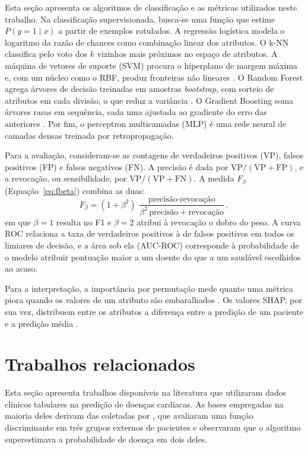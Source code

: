 \documentclass[12pt]{article}
\begin{document}
Esta seção apresenta os algoritmos de classificação e as métricas utilizados
neste trabalho. Na classificação supervisionada, busca-se uma função que
estime $P(y=1 \mid x)$ a partir de exemplos rotulados. A regressão logística modela o logaritmo da razão de chances como combinação
linear dos atributos. O k-NN classifica pelo voto dos $k$ vizinhos mais
próximos no espaço de atributos. A máquina de vetores de
suporte (SVM) procura o hiperplano de margem máxima e, com um núcleo como o
RBF, produz fronteiras não lineares \cite{cortes:95}. O Random Forest agrega
árvores de decisão treinadas em amostras \textit{bootstrap}, com sorteio de
atributos em cada divisão, o que reduz a variância \cite{breiman:01}. O
Gradient Boosting soma árvores rasas em sequência, cada uma ajustada ao
gradiente do erro das anteriores \cite{friedman:01}. Por fim, o perceptron
multicamadas (MLP) é uma rede neural de camadas densas treinada por
retropropagação.

Para a avaliação, consideram-se as contagens de verdadeiros positivos (VP),
falsos positivos (FP) e falsos negativos (FN). A precisão é dada por
$\mathrm{VP}/(\mathrm{VP}+\mathrm{FP})$, e a revocação, ou sensibilidade, por
$\mathrm{VP}/(\mathrm{VP}+\mathrm{FN})$. A medida $F_\beta$
(Equação~\ref{eq:fbeta}) combina as duas:
\begin{equation}
\label{eq:fbeta}
F_\beta = (1+\beta^2)\,\frac{\text{precisão}\cdot\text{revocação}}
{\beta^2\,\text{precisão}+\text{revocação}},
\end{equation}
em que $\beta=1$ resulta no F1 e $\beta=2$ atribui à revocação o dobro do
peso. A curva ROC relaciona a taxa de verdadeiros positivos à de falsos
positivos em todos os limiares de decisão, e a área sob ela (AUC-ROC)
corresponde à probabilidade de o modelo atribuir pontuação maior a um doente
do que a um saudável escolhidos ao acaso.

Para a interpretação, a importância por permutação mede quanto uma métrica
piora quando os valores de um atributo são embaralhados \cite{breiman:01}. Os
valores SHAP, por sua vez, distribuem entre os atributos a diferença entre a
predição de um paciente e a predição média \cite{lundberg:17}.

\section{Trabalhos relacionados}
\label{sec:relacionados}

Esta seção apresenta trabalhos disponíveis na literatura que utilizaram dados
clínicos tabulares na predição de doenças cardíacas. As bases empregadas na
maioria deles derivam das coletadas por \cite{detrano:89}, que avaliaram uma
função discriminante em três grupos externos de pacientes e observaram que o
algoritmo superestimava a probabilidade de doença em dois deles.
\end{document}

